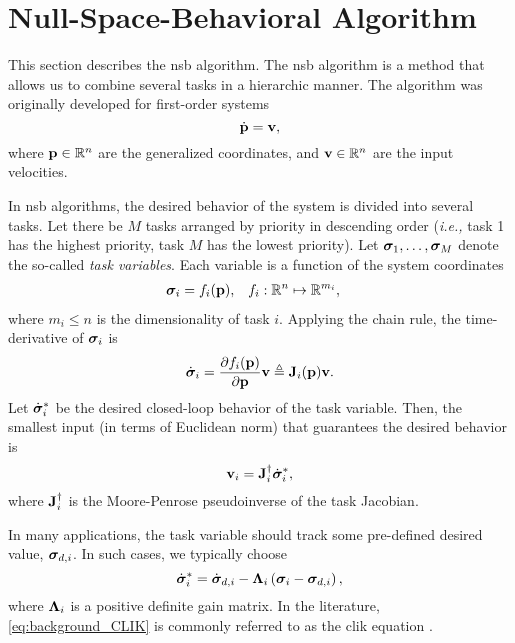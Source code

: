 \section{Null-Space-Behavioral Algorithm}
\label{sec:background_NSB}

This section describes the \acrfull{nsb} algorithm.
The \gls{nsb} algorithm is a method that allows us to combine several tasks in a hierarchic manner.
The algorithm was originally developed for first-order systems
\begin{equation}
    \dot{\mathbf{p}} = \mathbf{v},
\end{equation}
where $\mathbf{p} \in \mathbb{R}^n$ are the generalized coordinates, and $\mathbf{v} \in \mathbb{R}^n$ are the input velocities.

In \gls{nsb} algorithms, the desired behavior of the system is divided into several tasks.
Let there be $M$ tasks arranged by priority in descending order (\emph{i.e.,} task 1 has the highest priority, task $M$ has the lowest priority).
Let $\bm{\sigma}_1, \ldots, \bm{\sigma}_M$ denote the so-called \emph{task variables}.
Each variable is a function of the system coordinates
\begin{align}
    \bm{\sigma}_i &= f_i(\mathbf{p}), &
    f_i &: \mathbb{R}^n \mapsto \mathbb{R}^{m_i},
\end{align}
where $m_i \leq n$ is the dimensionality of task $i$.
Applying the chain rule, the time-derivative of $\bm{\sigma}_i$ is
\begin{equation}
    \dot{\bm{\sigma}}_i = \frac{\partial f_i(\mathbf{p})}{\partial \mathbf{p}} \mathbf{v} \triangleq \mathbf{J}_i(\mathbf{p}) \mathbf{v}.
\end{equation}
Let $\dot{\bm{\sigma}}_i^{*}$ be the desired closed-loop behavior of the task variable.
Then, the smallest input (in terms of Euclidean norm) that guarantees the desired behavior is
\begin{equation}
    \mathbf{v}_i = \mathbf{J}_i^{\dagger} \dot{\bm{\sigma}}_i^{*},
    \label{eq:background_NSB_velocity_i}
\end{equation}
where $\mathbf{J}_i^{\dagger}$ is the Moore-Penrose pseudoinverse of the task Jacobian.

\begin{rmk*}
    In many applications, the task variable should track some pre-defined desired value, $\bm{\sigma}_{d, i}$.
    In such cases, we typically choose
    \begin{equation}
        \dot{\bm{\sigma}}_i^{*} = \dot{\bm{\sigma}}_{d, i} - \bm{\Lambda}_i \left(\bm{\sigma}_i - \bm{\sigma}_{d,i}\right),  
        \label{eq:background_CLIK}  
    \end{equation}
    where $\bm{\Lambda}_i$ is a positive definite gain matrix.
    In the literature, \eqref{eq:background_CLIK} is commonly referred to as the \gls{clik} equation \cite{antonelli_2006_kinematic}.
\end{rmk*}

